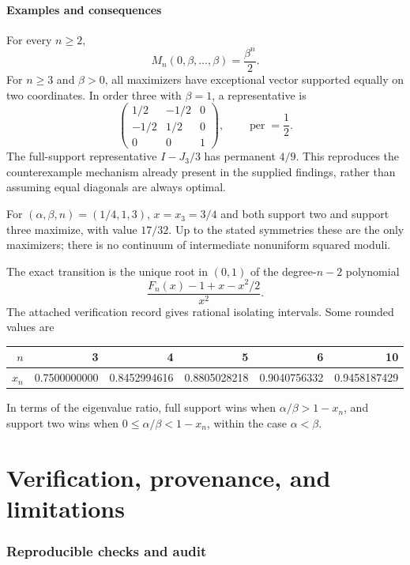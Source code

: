 \documentclass[11pt]{article}
\newcommand{\per}{\operatorname{per}}
\theoremstyle{definition}\newtheorem{definition}[theorem]{Definition}
\theoremstyle{remark}\newtheorem{remark}[theorem]{Remark}
\begin{document}
\subsection{Examples and consequences}
For every $n\geq2$,
\[
 \boxed{M_n(0,\beta,\ldots,\beta)=\frac{\beta^n}{2}.}
\]
For $n\geq3$ and $\beta>0$, all maximizers have exceptional vector supported equally on two coordinates. In order three with $\beta=1$, a representative is
\[
 \begin{pmatrix}
 1/2&-1/2&0\\-1/2&1/2&0\\0&0&1
 \end{pmatrix},
 \qquad \per=\frac12.
\]
The full-support representative $I-J_3/3$ has permanent $4/9$. This reproduces the counterexample mechanism already present in the supplied findings, rather than assuming equal diagonals are always optimal.

For $(\alpha,\beta,n)=(1/4,1,3)$, $x=x_3=3/4$ and both support two and support three maximize, with value $17/32$. Up to the stated symmetries these are the only maximizers; there is no continuum of intermediate nonuniform squared moduli.

The exact transition is the unique root in $(0,1)$ of the degree-$n-2$ polynomial
\[
 \frac{F_n(x)-1+x-x^2/2}{x^2}.
\]
The attached verification record gives rational isolating intervals. Some rounded values are
\begin{center}
\begin{tabular}{@{}rrrrrr@{}}
\toprule
$n$&3&4&5&6&10\\
\midrule
$x_n$&0.7500000000&0.8452994616&0.8805028218&0.9040756332&0.9458187429\\
\bottomrule
\end{tabular}
\end{center}
In terms of the eigenvalue ratio, full support wins when $\alpha/\beta>1-x_n$, and support two wins when $0\leq\alpha/\beta<1-x_n$, within the case $\alpha<\beta$.

\part{Verification, provenance, and limitations}

\section{Reproducible checks and audit}
\end{document}
